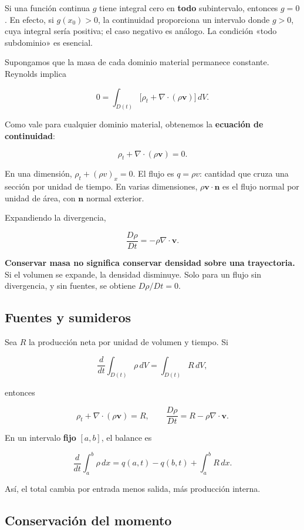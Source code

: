\documentclass[11pt,a4paper]{article}
\begin{document}
Si una función continua \(g\) tiene integral cero en \textbf{todo}
subintervalo, entonces \(g=0\). En efecto, si \(g(x_0)>0\), la
continuidad proporciona un intervalo donde \(g>0\), cuya integral sería
positiva; el caso negativo es análogo. La condición «todo subdominio» es
esencial.

Supongamos que la masa de cada dominio material permanece constante.
Reynolds implica

\[0=\int_{D(t)}\bigl[\rho_t+\nabla\cdot(\rho\mathbf v)\bigr]\,dV.\]

Como vale para cualquier dominio material, obtenemos la \textbf{ecuación
de continuidad}:

\[\boxed{\rho_t+\nabla\cdot(\rho\mathbf v)=0.}\tag{2.13}\]

En una dimensión, \(\rho_t+(\rho v)_x=0\). El flujo es \(q=\rho v\):
cantidad que cruza una sección por unidad de tiempo. En varias
dimensiones, \(\rho\mathbf v\cdot\mathbf n\) es el flujo normal por
unidad de área, con \(\mathbf n\) normal exterior.

Expandiendo la divergencia,

\[\frac{D\rho}{Dt}=-\rho\nabla\cdot\mathbf v.\]

\textbf{Conservar masa no significa conservar densidad sobre una
trayectoria.} Si el volumen se expande, la densidad disminuye. Solo para
un flujo sin divergencia, y sin fuentes, se obtiene \(D\rho/Dt=0\).

\hypertarget{fuentes-y-sumideros}{%
\subsection{Fuentes y sumideros}\label{fuentes-y-sumideros}}

Sea \(R\) la producción neta por unidad de volumen y tiempo. Si

\[\frac{d}{dt}\int_{D(t)}\rho\,dV=\int_{D(t)}R\,dV,\]

entonces

\[\rho_t+\nabla\cdot(\rho\mathbf v)=R,\qquad \frac{D\rho}{Dt}=R-\rho\nabla\cdot\mathbf v.\]

En un intervalo \textbf{fijo} \([a,b]\), el balance es

\[\frac{d}{dt}\int_a^b\rho\,dx=q(a,t)-q(b,t)+\int_a^b R\,dx.\]

Así, el total cambia por entrada menos salida, más producción interna.

\hypertarget{conservaciuxf3n-del-momento}{%
\subsection{Conservación del
momento}\label{conservaciuxf3n-del-momento}}
\end{document}
